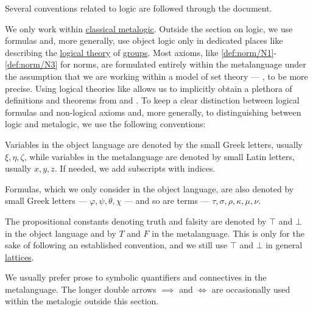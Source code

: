\begin{remark}\label{rem:mathematical_logic_conventions}
  Several conventions related to logic are followed through the document.

  We only work within \hyperref[def:classical_propositional_deductive_systems]{classical metalogic}. Outside the section on logic, we use formulas and, more generally, use object logic only in dedicated places like  describing the \hyperref[def:first_order_theory]{logical theory} of \hyperref[def:group]{groups}. Most axioms, like \ref{def:norm/N1}-\ref{def:norm/N3} for norms, are formulated entirely within the metalanguage under the assumption that we are working within a model of set theory --- \hyperref[def:axiom_of_universes]{}, to be more precise. Using logical theories like  allows us to implicitly obtain a plethora of definitions and theorems from  and . To keep a clear distinction between logical formulas and non-logical axioms and, more generally, to distinguishing between logic and metalogic, we use the following conventions:

  \begin{thmenum}
     Variables in the object language are denoted by the small Greek letters, usually \( \xi, \eta, \zeta \), while variables in the metalanguage are denoted by small Latin letters, usually \( x, y, z \). If needed, we add subscripts with indices.

     Formulas, which we only consider in the object language, are also denoted by small Greek letters --- \( \varphi, \psi, \theta, \chi \) --- and so are terms --- \( \tau, \sigma, \rho, \kappa, \mu, \nu \).

     The propositional constants denoting truth and falsity are denoted by \( \top \) and \( \bot \) in the object language and by \( T \) and \( F \) in the metalanguage. This is only for the sake of following an established convention, and we still use \( \top \) and \( \bot \) in general \hyperref[def:semilattice/lattice]{lattices}.

     We usually prefer prose to symbolic quantifiers and connectives in the metalanguage. The longer double arrows \( \implies \) and \( \iff \) are occasionally used within the metalogic outside this section.


\end{thmenum}
\end{remark}
